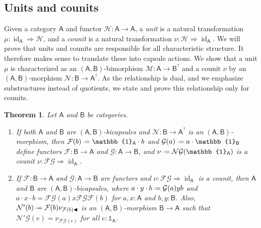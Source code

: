 \documentclass{amsart}
\newcommand{\Cat}[1]{\mathsf{#1}}
\newcommand{\cat}[1]{\Cat{#1}}
\numberwithin{lstfloat}{section}
\DeclareMathOperator{\id}{id}
\newcommand{\srcfunc}{\mathbin{\blacktriangleleft}}
\newcommand{\src}[1]{#1\srcfunc}
\newcommand{\one}{\mathbb{1}}
\newcommand{\defeq}{\mathrel{\hstretch{.13}{=}\hspace{.2ex}{=}}}
\newcommand{\func}[1]{\mathcal{#1}}
\newcommand{\fF}{\func{F}}
\newcommand{\fG}{\func{G}}
\newcommand{\fH}{\func{H}}
\newcommand{\fM}{\func{M}}
\newcommand{\fN}{\func{N}}
\newcommand{\cA}{\cat{A}}
\newcommand{\cB}{\cat{B}}
\newenvironment{ithm}{\begin{enumerate}[label={\rm(\alph*)}, ref=(\alph*),
      labelwidth=18pt, leftmargin=18pt, topsep=3pt, itemsep=1pt, parsep=2pt]}
      {\end{enumerate}}
\newtheorem{thm}{Theorem}[section]
\theoremstyle{definition}
\theoremstyle{remark}
\numberwithin{equation}{section}
\begin{document}
\subsection{Units and counits}
Given a category $\cA$ and functor $\fH:\cA\to \cA$, a \emph{unit} is a 
natural transformation $\mu:\id_{\cA}\Rightarrow \fH$, and a \emph{counit} is a natural transformation 
$\nu:\fH\Rightarrow \id_{\cA}$.  We 
will prove that units and counits 
are responsible for all characteristic structure.  
It therefore makes sense to translate these into capsule actions.
We show that a unit $\mu$ is characterized as 
an $(\cA,\cB)$-bimorphism $\fM:\cA\to \cB^?$
and a counit $\nu$ by an $(\cA,\cB)$-morphism $\fN:\cB\to \cA^?$.  
As the relationship is dual, 
and we emphasize substructures instead of quotients, we state and 
prove this relationship only for counits.

\begin{thm}\label{thm:counit-capsules}
  Let $\cA$ and $\cB$ be categories.
  \begin{ithm}


    \item\label{thmpart:bicap-to-counit} If both $\cA$ and $\cB$ are $(\cA,\cB)$-bicapsules and $\fN:\cB\to \cA^?$ is an
    $(\cA,\cB)$-morphism, then $\fF(b)\defeq \one_{\cA}\cdot b$ and $\fG(a)\defeq a\cdot \one_{\cB}$ 
    define functors $\func{F} :\cB \to \cA$ and $\fG : \cA \to \cB$, and $\nu\defeq\fN\fG(\one_{\cA})$ 
    is a counit $\nu:\fF\fG\Rightarrow \id_{\cA}$.

    
  
  \item\label{thmpart:counit-to-bicap} 
  If $\fF:\cB\to \cA$ and $\fG:\cA\to \cB$ are functors and $\nu:\fF\fG\Rightarrow \id_{\cA}$
  is a counit, then $\cA$ and $\cB$ are $(\cA,\cB)$-bicapsules, 
  where
  $a\cdot y\cdot b\defeq \fG(a)yb$ and $a\cdot x\cdot b=\fF\fG(a)x\fF\fG\fF(b)$ for $a,x:\cA$ and $b,y:\cB$.
  Also,
  $\fN'(b)\defeq \fF(b)\nu_{\src{\fF(b)}}$ is an $(\cA,\cB)$-morphism $\cB\to \cA$ such that
  $\fN'\fG(e)=\nu_{\fF\fG(e)}$ for all $e:\one_{\cA}$.
  \end{ithm}
\end{thm}
\end{document}
